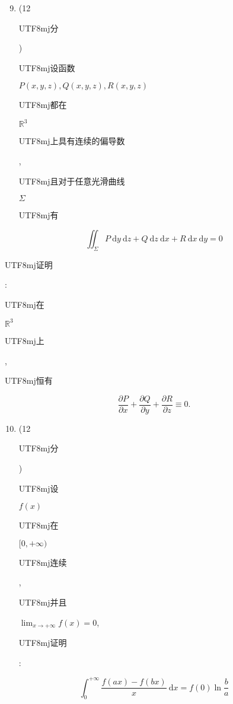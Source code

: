 \documentclass[10pt]{article}
\begin{document}
\begin{enumerate}
  \setcounter{enumi}{8}
  \item (12 \begin{CJK}{UTF8}{mj}分\end{CJK}) \begin{CJK}{UTF8}{mj}设函数\end{CJK} $P(x, y, z), Q(x, y, z), R(x, y, z)$ \begin{CJK}{UTF8}{mj}都在\end{CJK} $\mathbb{R}^{3}$ \begin{CJK}{UTF8}{mj}上具有连续的偏导数\end{CJK}, \begin{CJK}{UTF8}{mj}且对于任意光滑曲线\end{CJK} $\Sigma$ \begin{CJK}{UTF8}{mj}有\end{CJK}
\end{enumerate}
$$
\iint_{\Sigma} P \mathrm{~d} y \mathrm{~d} z+Q \mathrm{~d} z \mathrm{~d} x+R \mathrm{~d} x \mathrm{~d} y=0
$$
\begin{CJK}{UTF8}{mj}证明\end{CJK}: \begin{CJK}{UTF8}{mj}在\end{CJK} $\mathbb{R}^{3}$ \begin{CJK}{UTF8}{mj}上\end{CJK}, \begin{CJK}{UTF8}{mj}恒有\end{CJK}
$$
\frac{\partial P}{\partial x}+\frac{\partial Q}{\partial y}+\frac{\partial R}{\partial z} \equiv 0 .
$$

\begin{enumerate}
  \setcounter{enumi}{9}
  \item (12 \begin{CJK}{UTF8}{mj}分\end{CJK}) \begin{CJK}{UTF8}{mj}设\end{CJK} $f(x)$ \begin{CJK}{UTF8}{mj}在\end{CJK} $[0,+\infty)$ \begin{CJK}{UTF8}{mj}连续\end{CJK}, \begin{CJK}{UTF8}{mj}并且\end{CJK} $\lim _{x \rightarrow+\infty} f(x)=0$, \begin{CJK}{UTF8}{mj}证明\end{CJK}:
\end{enumerate}
$$
\int_{0}^{+\infty} \frac{f(a x)-f(b x)}{x} \mathrm{~d} x=f(0) \ln \frac{b}{a}
$$
\end{document}
